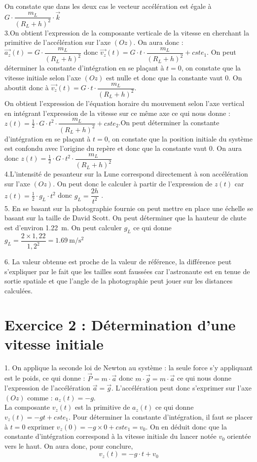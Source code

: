 \documentclass[a4paper,11pt,fleqn]{article}%
\begin{document}
On constate que dans les deux cas le vecteur accélération est égale à $G \cdot \dfrac{m_L}{(R_L + h)^2} \cdot \vec{k}$\\

3.On obtient l'expression de la composante verticale de la vitesse en cherchant la primitive de l'accélération sur l'axe $(Oz)$. On aura donc : $\vec{a_z}(t) = G \cdot \dfrac{m_L}{(R_L + h)^2}$ donc $\vec{v_z}(t) = G \cdot t \cdot \dfrac{m_L}{(R_L + h)^2} + cste_1$. On peut déterminer la constante d'intégration en se plaçant à $t=0$, on constate que la vitesse initiale selon l'axe $(Oz)$ est nulle et donc que la constante vaut $0$. On aboutit donc à $\vec{v_z}(t) = G \cdot t \cdot \dfrac{m_L}{(R_L + h)^2}$.\\
On obtient l'expression de l'équation horaire du mouvement selon l'axe vertical en intégrant l'expression de la vitesse sur ce même axe ce qui nous donne : $z(t) = \frac{1}{2} \cdot G \cdot t^2 \cdot \dfrac{m_L}{(R_L + h)^2} + cste_2$.On peut déterminer la constante d'intégration en se plaçant à $t=0$, on constate que la position initiale du système est confondu avec l'origine du repère et donc que la constante vaut $0$. On aura donc $z(t) = \frac{1}{2} \cdot G \cdot t^2 \cdot \dfrac{m_L}{(R_L + h)^2}$\\

4.L'intensité de pesanteur sur la Lune correspond directement à son accélération sur l'axe $(Oz)$. On peut donc le calculer à partir de l'expression de $z(t)$ car$z(t) = \frac{1}{2} \cdot g_L \cdot t^2$ donc $g_L = \dfrac{2h}{t^2}$ .\\

5. En se basant sur la photographie fournie on peut mettre en place une échelle se basant sur la taille de David Scott. On peut déterminer que la hauteur de chute est d'environ \SI{1,22}{\meter}. On peut calculer $g_L$ ce qui donne $g_L = \dfrac{2 \times 1,22}{1,2^2}=\SI{1,69}{\meter \per \second \squared}$

6. La valeur obtenue est proche de la valeur de référence, la différence peut s'expliquer par le fait que les tailles sont faussées car l'astronaute est en tenue de sortie spatiale et que l'angle de la photographie peut jouer sur les distances calculées.

\section*{Exercice 2 : Détermination d'une vitesse initiale}
1. On applique la seconde loi de Newton au système : la seule force s'y appliquant est le poids, ce qui donne : $\vec{P}=m \cdot \vec{a}$ donc $m \cdot \vec{g}=m \cdot \vec{a}$ ce qui nous donne l'expression de l'accélération $\vec{a}=\vec{g}$. L'accélération peut donc s'exprimer sur l'axe $(Oz)$ comme : $a_z(t)=-g$.\\
La composante $v_z(t)$ est la primitive de $a_z(t)$ ce qui donne $v_z(t)= -gt + cste_1$. Pour déterminer la constante d'intégration, il faut se placer à $t=0$ exprimer $v_z(0) = -g\times 0 + cste_1 = v_0$. On en déduit donc que la constante d'intégration correspond à la vitesse initiale du lancer notée $v_0$ orientée vers le haut. On aura donc, pour conclure, $$v_z(t) = -g\cdot t + v_0$$
\end{document}

